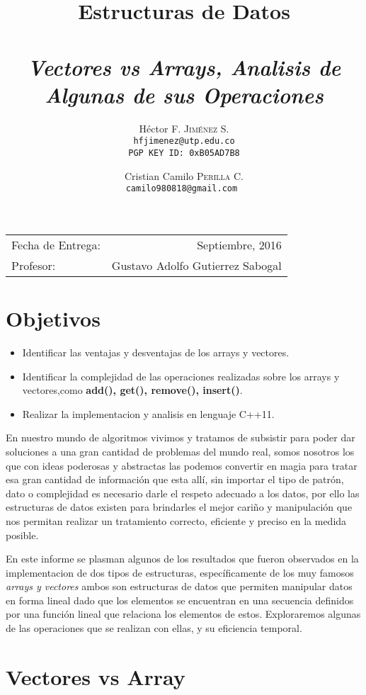 \documentclass[paper=a4, fontsize=12pt]{article} 		%
\title{Estructuras de Datos\\ 
\horrule{0.5pt} \\[0.4cm] 								%
\textit{Vectores vs Arrays, Analisis de Algunas de sus Operaciones}
\horrule{1pt} \\[0.5cm] 			
} 			%
\author{												%
Héctor F. \textsc{Jiménez S.}\\
\texttt{hfjimenez@utp.edu.co} \\
\texttt{PGP KEY ID: 0xB05AD7B8}
\and
Cristian Camilo \textsc{Perilla C.}\\
\texttt{camilo980818@gmail.com }\\
}
\date{}    						                       %
\numberwithin{equation}{section}						%
\numberwithin{table}{section} 							%
\begin{document}
\maketitle                      			           %
\begin{center}
\begin{tabular}{l r}								   %
Fecha de Entrega: & Septiembre, 2016 \\				   %
Profesor: & Gustavo Adolfo Gutierrez Sabogal
\end{tabular}
\end{center}
\section{Objetivos}
\begin{itemize}
   \item Identificar las ventajas y desventajas de los arrays y vectores.
  \item Identificar la complejidad de las operaciones realizadas sobre los arrays y vectores,como \textbf{add(), get(), remove(), insert()}.
  \item Realizar la implementacion y analisis en lenguaje C++11. 
\end{itemize}
En nuestro mundo de algoritmos vivimos y tratamos de subsistir para poder dar soluciones a una gran cantidad de problemas del mundo real, somos nosotros los que con ideas poderosas y abstractas las podemos convertir en magia para tratar esa gran cantidad de información que esta allí, sin importar el tipo de patrón, dato o complejidad es necesario darle el respeto adecuado a los datos, por ello las estructuras de datos existen para brindarles el mejor cariño y manipulación que nos permitan realizar un tratamiento correcto, eficiente y preciso en la medida posible. 

En este informe se plasman algunos de los resultados que fueron observados en la implementacion de dos tipos de estructuras, específicamente de los muy famosos \emph{arrays y vectores} ambos son estructuras de datos que permiten manipular datos en forma lineal dado que  los elementos se encuentran en una secuencia definidos por una función lineal que relaciona los elementos de estos. Exploraremos algunas de las operaciones que se realizan con ellas, y su eficiencia temporal.

\section{Vectores vs Array}
\end{document}
